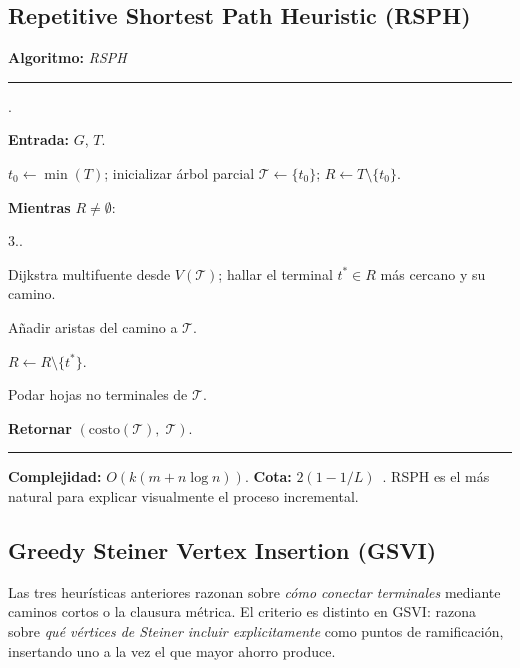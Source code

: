 \documentclass[11pt]{article}
\newcounter{pcstep}
\newcounter{innerpc}
\newcounter{innerpcb}
\newenvironment{pseudocode}[1]{%
  \medskip
  \noindent\textbf{Algoritmo:} \textit{#1}\\
  \noindent\rule{\linewidth}{0.4pt}
  \begin{list}{\arabic{pcstep}.}{\usecounter{pcstep}%
    \setlength{\leftmargin}{2em}\setlength{\itemsep}{2pt}}
}{%
  \end{list}
  \noindent\rule{\linewidth}{0.4pt}
  \medskip
}
\begin{document}
\subsection{Repetitive Shortest Path Heuristic (RSPH)}

\begin{pseudocode}{RSPH}
  \item \textbf{Entrada:} $G$, $T$.
  \item $t_0 \gets \min(T)$; inicializar \'arbol parcial
        $\mathcal{T} \gets \{t_0\}$; $R \gets T\setminus\{t_0\}$.
  \item \textbf{Mientras} $R\ne\emptyset$:
    \begin{list}{3..}{%
      \setlength{\leftmargin}{3em}\setlength{\itemsep}{1pt}}
      \item Dijkstra multifuente desde $V(\mathcal{T})$; hallar el terminal
            $t^*\in R$ m\'as cercano y su camino.
      \item A\~nadir aristas del camino a $\mathcal{T}$.
      \item $R \gets R\setminus\{t^*\}$.
    \end{list}
  \item Podar hojas no terminales de $\mathcal{T}$.
  \item \textbf{Retornar} $(\mathrm{costo}(\mathcal{T}),\;\mathcal{T})$.
\end{pseudocode}

\textbf{Complejidad:} $O(k(m+n\log n))$.
\textbf{Cota:} $2(1-1/L)$~\cite{TakahashiMatsuyama1980}.
RSPH es el m\'as natural para explicar visualmente el proceso incremental.

\subsection{Greedy Steiner Vertex Insertion (GSVI)}

Las tres heur\'isticas anteriores razonan sobre \emph{c\'omo conectar terminales}
mediante caminos cortos o la clausura m\'etrica.  El criterio es distinto en GSVI:
razona sobre \emph{qu\'e v\'ertices de Steiner incluir explicitamente} como puntos
de ramificaci\'on, insertando uno a la vez el que mayor ahorro produce.
\end{document}
